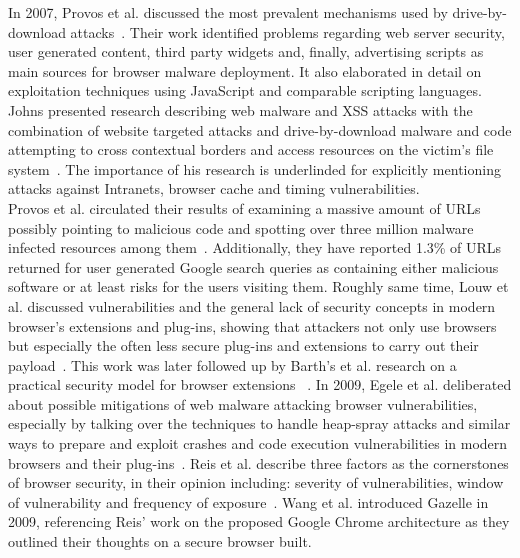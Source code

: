 \begin{itemize}
      In 2007, Provos et al. discussed the most prevalent mechanisms used by drive-by-download attacks~\cite{provos2007ghost}. Their work identified problems regarding web server security, user generated content, third party widgets and, finally, advertising scripts as main sources for browser malware deployment. It also elaborated in detail on exploitation techniques using JavaScript and comparable scripting languages. Johns presented research describing web malware and XSS attacks with the combination of website targeted attacks and drive-by-download malware and code attempting to cross contextual borders and access resources on the victim's file system~\cite{johns2008javascript}. The importance of his research is underlinded for explicitly mentioning attacks against Intranets, browser cache and timing vulnerabilities. \\
 
      Provos et al. circulated their results of examining a massive amount of URLs possibly pointing to malicious code  and spotting over three million malware infected resources among them~\cite{provos2008all}. Additionally, they have reported 1.3\% of URLs returned for user generated Google search queries as containing either malicious software or at least risks for the users visiting them. Roughly same time, Louw et al. discussed vulnerabilities and the general lack of security concepts in modern browser's extensions and plug-ins, showing that attackers not only use browsers but especially the often less secure plug-ins and extensions to carry out their payload~\cite{ter2008enhancing}. This work was later followed up by Barth's et al. research on a practical security model for browser extensions ~\cite{barth2010protecting}. In 2009, Egele et al. deliberated about possible mitigations of web malware attacking browser vulnerabilities, especially by talking over the techniques to handle heap-spray attacks and similar ways to prepare and exploit crashes and code execution vulnerabilities in modern browsers and their plug-ins~\cite{egele2009defending}. Reis et al. describe three factors as the cornerstones of browser security, in their opinion including: severity of vulnerabilities, window of vulnerability and frequency of exposure~\cite{reis2009browser}. Wang et al. introduced Gazelle in 2009, referencing Reis' work on the proposed Google Chrome architecture as they outlined their thoughts on a secure browser built. \\


\end{itemize}
